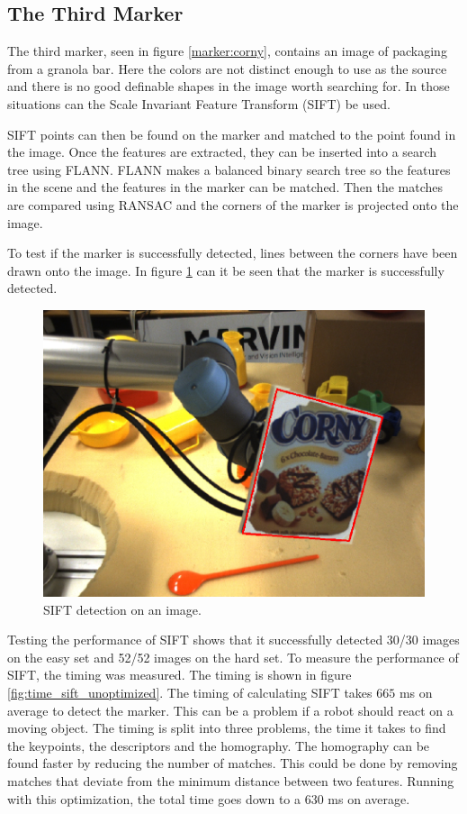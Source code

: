 \subsection{The Third Marker}\label{sec:full_marker3}
The third marker, seen in figure \ref{marker:corny}, contains an image of packaging from a granola bar.
Here the colors are not distinct enough to use as the source and there is no good definable shapes in the image worth searching for.
In those situations can the Scale Invariant Feature Transform (SIFT) be used.

SIFT points can then be found on the marker and matched to the point found in the image.
Once the features are extracted, they can be inserted into a search tree using FLANN.
FLANN makes a balanced binary search tree so the features in the scene and the features in the marker can be matched.
Then the matches are compared using RANSAC and the corners of the marker is projected onto the image. 

To test if the marker is successfully detected, lines between the corners have been drawn onto the image.
In figure \ref{fig:sift_detection} can it be seen that the marker is successfully detected.

\begin{figure}[h]
 \centering
 \includegraphics[width=\exampleWidth]{graphics/sift_detection}
 \caption{SIFT detection on an image.}
 \label{fig:sift_detection}
\end{figure}

Testing the performance of SIFT shows that it successfully detected 30/30 images on the easy set and 52/52 images on the hard set.
To measure the performance of SIFT, the timing was measured. 
The timing is shown in figure \ref{fig:time_sift_unoptimized}. 
The timing of calculating SIFT takes $665$ ms on average to detect the marker.
This can be a problem if a robot should react on a moving object.
The timing is split into three problems, the time it takes to find the keypoints, the descriptors and the homography.
The homography can be found faster by reducing the number of matches.
This could be done by removing matches that deviate from the minimum distance between two features.
Running with this optimization, the total time goes down to a $630$ ms on average.


